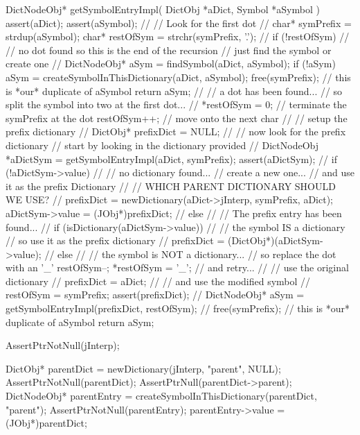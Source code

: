 \startCCode
DictNodeObj* getSymbolEntryImpl(
  DictObj *aDict,
  Symbol  *aSymbol
) {
  assert(aDict);
  assert(aSymbol);
  //
  // Look for the first dot
  //
  char* symPrefix = strdup(aSymbol);
  char* restOfSym = strchr(symPrefix, '.');
  //
  if (!restOfSym) {
    //
    // no dot found so this is the end of the recursion
    // just find the symbol or create one
    //
    DictNodeObj* aSym = findSymbol(aDict, aSymbol);
    if (!aSym) {
      aSym = createSymbolInThisDictionary(aDict, aSymbol);
    }
    free(symPrefix); // this is *our* duplicate of aSymbol
    return aSym;
  }
  //
  // a dot has been found...
  // so split the symbol into two at the first dot...
  //
  *restOfSym = 0; // terminate the symPrefix at the dot
  restOfSym++;    // move onto the next char
  //
  // setup the prefix dictionary
  //
  DictObj* prefixDict = NULL;
  //
  // now look for the prefix dictionary
  // start by looking in the dictionary provided
  //
  DictNodeObj *aDictSym =
    getSymbolEntryImpl(aDict, symPrefix);
  assert(aDictSym);
  //
  if (!aDictSym->value) {
    //
    // no dictionary found...
    // create a new one...
    // and use it as the prefix Dictionary
    //
    // WHICH PARENT DICTIONARY SHOULD WE USE?
    //
    prefixDict = 
      newDictionary(aDict->jInterp, symPrefix, aDict);
    aDictSym->value = (JObj*)prefixDict;
    //
  } else {
    //
    // The prefix entry has been found...
    //
    if (isDictionary(aDictSym->value)) {
      //
      // the symbol IS a dictionary
      // so use it as the prefix dictionary
      //
      prefixDict = (DictObj*)(aDictSym->value);
      //
    } else {
      //
      // the symbol is NOT a dictionary...
      // so replace the dot with an '_'
      restOfSym--;
      *restOfSym = '_';
      // and retry...
      //
      // use the original dictionary
      //
      prefixDict = aDict;
      //
      // and use the modified symbol
      //
      restOfSym = symPrefix;
    }
  }
  assert(prefixDict);
  //
  DictNodeObj* aSym =
    getSymbolEntryImpl(prefixDict, restOfSym);
  //
  free(symPrefix); // this is *our* duplicate of aSymbol
  return aSym;
}
\stopCCode

\startCTest
  AssertPtrNotNull(jInterp);

  DictObj* parentDict =
    newDictionary(jInterp, "parent", NULL);
  AssertPtrNotNull(parentDict);
  AssertPtrNull(parentDict->parent);
  DictNodeObj* parentEntry =
    createSymbolInThisDictionary(parentDict, "parent");
  AssertPtrNotNull(parentEntry);
  parentEntry->value = (JObj*)parentDict;
  
